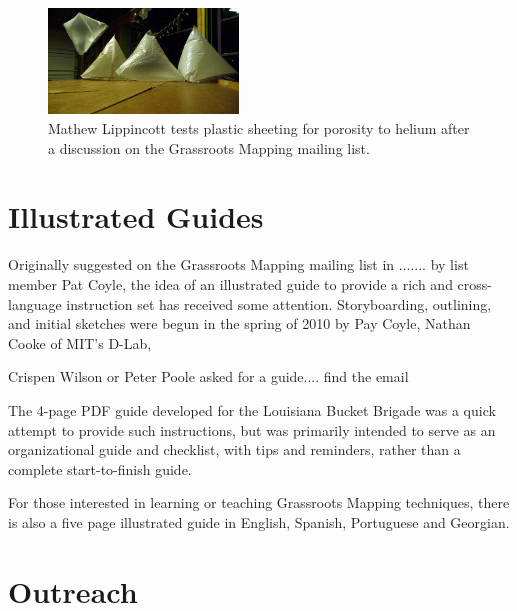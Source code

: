 \documentclass[11pt]{report}
\begin{document}
\begin{figure}
	\begin{flushright}
		\includegraphics[width=0.45\textwidth]{images/mathew-lippincott-balloons.png}
		\caption{Mathew Lippincott tests plastic sheeting for porosity to helium after a discussion on the Grassroots Mapping mailing list.\cite{lippincott2010helium}}
	\end{flushright}
\end{figure}



\section{Illustrated Guides}
\label{sec:guide}

Originally suggested on the Grassroots Mapping mailing list in ....... by list member Pat Coyle, the idea of an illustrated guide to provide a rich and cross-language instruction set has received some attention. Storyboarding, outlining, and initial sketches were begun in the spring of 2010 by Pay Coyle, Nathan Cooke of MIT's D-Lab, 

Crispen Wilson or Peter Poole asked for a guide.... find the email

The 4-page PDF guide developed for the Louisiana Bucket Brigade was a quick attempt to provide such instructions, but was primarily intended to serve as an organizational guide and checklist, with tips and reminders, rather than a complete start-to-finish guide. 

For those interested in learning or teaching Grassroots Mapping techniques, there is also a five page illustrated guide in English, Spanish, Portuguese and Georgian.

\section{Outreach}
\end{document}
